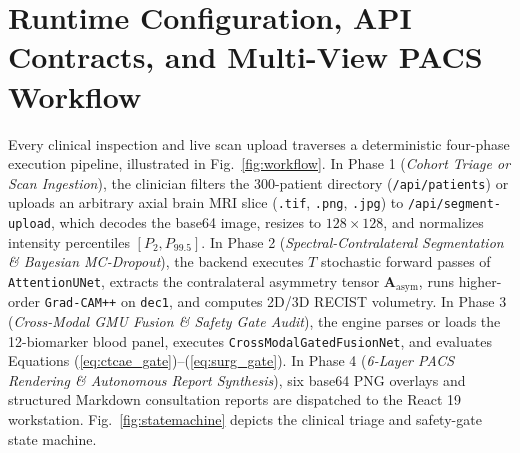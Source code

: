 \documentclass[journal,onecolumn,10pt]{IEEEtran}
\begin{document}
\section{Runtime Configuration, API Contracts, and Multi-View PACS Workflow}
Every clinical inspection and live scan upload traverses a deterministic four-phase execution pipeline, illustrated in Fig.~\ref{fig:workflow}. In Phase 1 (\textit{Cohort Triage or Scan Ingestion}), the clinician filters the 300-patient directory (\texttt{/api/patients}) or uploads an arbitrary axial brain MRI slice (\texttt{.tif}, \texttt{.png}, \texttt{.jpg}) to \texttt{/api/segment-upload}, which decodes the base64 image, resizes to $128\times 128$, and normalizes intensity percentiles $[P_{2}, P_{99.5}]$. In Phase 2 (\textit{Spectral-Contralateral Segmentation \& Bayesian MC-Dropout}), the backend executes $T$ stochastic forward passes of \texttt{AttentionUNet}, extracts the contralateral asymmetry tensor $\mathbf{A}_{\text{asym}}$, runs higher-order \texttt{Grad-CAM++} on \texttt{dec1}, and computes 2D/3D RECIST volumetry. In Phase 3 (\textit{Cross-Modal GMU Fusion \& Safety Gate Audit}), the engine parses or loads the 12-biomarker blood panel, executes \texttt{CrossModalGatedFusionNet}, and evaluates Equations (\ref{eq:ctcae_gate})--(\ref{eq:surg_gate}). In Phase 4 (\textit{6-Layer PACS Rendering \& Autonomous Report Synthesis}), six base64 PNG overlays and structured Markdown consultation reports are dispatched to the React 19 workstation. Fig.~\ref{fig:statemachine} depicts the clinical triage and safety-gate state machine.
\end{document}

